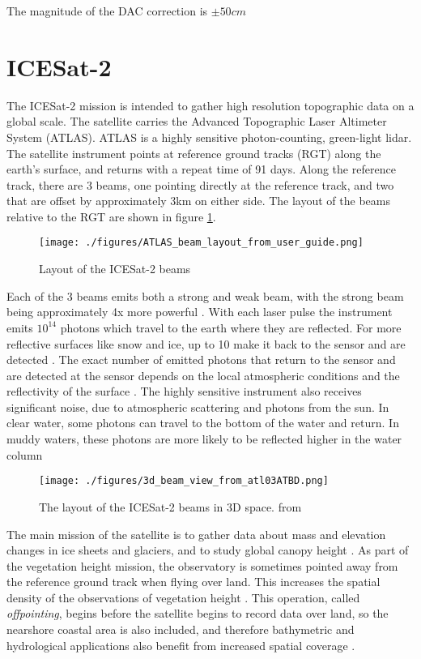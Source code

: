 The magnitude of the DAC correction is $\pm 50 cm$


\section{ICESat-2}

The ICESat-2 mission is intended to gather high resolution topographic data on a global scale. The satellite carries the Advanced Topographic Laser Altimeter System (ATLAS). ATLAS is a highly sensitive photon-counting, green-light lidar. The satellite instrument points at reference ground tracks (RGT) along the earth's surface, and returns with a repeat time of 91 days. Along the reference track, there are 3 beams, one pointing directly at the reference track, and two that are offset by approximately 3km on either side. The layout of the beams relative to the RGT are shown in figure \ref{fig:icesat-rgts}.

\begin{figure}[h!]
      \centering
      \texttt{[image: ./figures/ATLAS\_beam\_layout\_from\_user\_guide.png]}
      \caption{Layout of the ICESat-2 beams}
      \label{fig:icesat-rgts}
\end{figure}

Each of the 3 beams emits both a strong and weak beam, with the strong beam being approximately 4x more powerful \parencite{Neumann2019d}. With each laser pulse the instrument emits \(10^{14}\) photons which travel to the earth where they are reflected. For more reflective surfaces like snow and ice, up to 10 make it back to the sensor and are detected \parencite{Neumann2019d}. The exact number of emitted photons that return to the sensor and are detected at the sensor depends on the local atmospheric conditions and the reflectivity of the surface \parencite{Neumann2019e}. The highly sensitive instrument also receives significant noise, due to atmospheric scattering and photons from the sun. In clear water, some photons can travel to the bottom of the water and return. In muddy waters, these photons are more likely to be reflected higher in the water column \parencite{Ranndal2021}

\begin{figure}[htbp]
      \centering
      \texttt{[image: ./figures/3d\_beam\_view\_from\_atl03ATBD.png]}
      \caption{The layout of the ICESat-2 beams in 3D space. from \cite{Neumann2019d}}
      \label{3d-beams}
\end{figure}


The main mission of the satellite is to gather data about mass and elevation changes in ice sheets and glaciers, and to study global canopy height \parencite{Markus2017}. As part of the vegetation height mission, the observatory is sometimes pointed away from the reference ground track when flying over land. This increases the spatial density of the observations of vegetation height \parencite{Markus2017}. This operation, called  \emph{offpointing}, begins before the satellite begins to record data over land, so the nearshore coastal area is also included, and therefore bathymetric and hydrological applications also benefit from increased spatial coverage \parencite{Magruder2021}.

